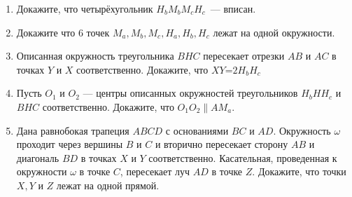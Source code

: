 \documentclass{article}
\begin{document}
\begin{enumerate}[label*=\protect\fbox{\arabic{enumi}}]
        \item Докажите, что четырёхугольник  $H_{b}M_{b}M_{c}H_c$~--- вписан.

        \item Докажите что 6 точек  $M_a, M_b, M_c, H_a, H_b, H_c$ лежат на одной окружности.

        \item Описанная окружность треугольника $BHC$ пересекает отрезки $AB$ и $AC$ в точках $Y$ и $X$ соответственно.
        Докажите, что $XY$=$2H_{b}H_c$

        \item Пусть $O_1$ и $O_2$ — центры описанных окружностей треугольников $H_{b}HH_c$ и $BHC$ соответственно.
        Докажите, что $O_{1}O_2 \parallel AM_a$.

        \item Дана равнобокая трапеция $ABCD$ с основаниями $BC$ и $AD$.
        Окружность $\omega$ проходит через вершины $B$ и $C$ и вторично пересекает сторону $AB$ и диагональ $BD$ в точках $X$ и $Y$ соответственно.
        Касательная, проведенная к окружности $\omega$ в точке $C$, пересекает луч $AD$ в точке $Z$.
        Докажите, что точки $X, Y$ и $Z$ лежат на одной прямой.

    \end{enumerate}
\end{document}
